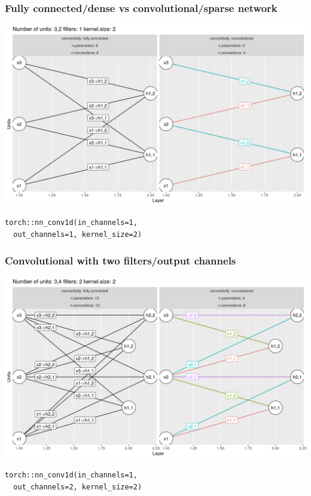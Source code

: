 \documentclass{beamer}
\begin{document}
\begin{frame}[fragile]
  \frametitle{Fully connected/dense vs convolutional/sparse network}
  \includegraphics[width=\textwidth]{figure-convolutional-filters-3-2-1}
\begin{verbatim}
torch::nn_conv1d(in_channels=1, 
  out_channels=1, kernel_size=2)
\end{verbatim}

\end{frame}

\begin{frame}[fragile]
  \frametitle{Convolutional with two filters/output channels}
  \includegraphics[width=\textwidth]{figure-convolutional-filters-3-2-2}
  
\begin{verbatim}
torch::nn_conv1d(in_channels=1, 
  out_channels=2, kernel_size=2)
\end{verbatim}
\end{frame}
\end{document}
